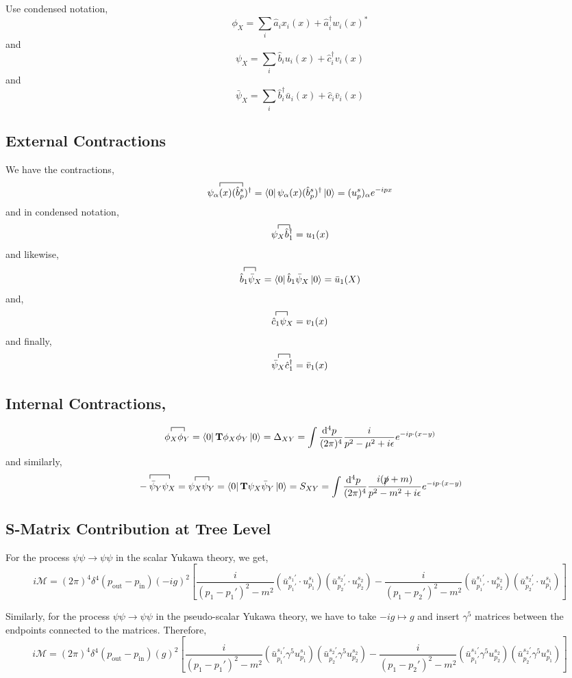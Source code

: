 \documentclass[12pt]{extarticle}
\newcommand{\bra}[1]{\left| #1 \right>}
\newcommand{\ket}[1]{\left| #1 \right>}
\renewcommand{\bra}[1]{\left< #1 \right|}
\newcommand{\dn}[2]{\! \mathrm{d}^{#1} #2 \:}
\renewcommand{\a}{\hat{a}}
\newcommand{\adag}{\hat{a}^\dagger}
\renewcommand{\b}{\hat{b}}
\newcommand{\bdag}{\hat{b}^\dagger}
\renewcommand{\c}{\hat{c}}
\newcommand{\cdag}{\hat{c}^\dagger}
\theoremstyle{definition}
\begin{document}
Use condensed notation,
\[ \phi_X = \sum_i \a_i x_i(x) + \adag_i w_i(x)^* \]
and 
\[ \psi_X = \sum_{i} \b_i u_i(x) + \cdag_i v_i(x) \]
and 
\[ \bar{\psi}_X = \sum_{i} \bdag_i \bar{u}_i (x) + \c_i \bar{v}_i (x) \]

\subsection{External Contractions}
We have the contractions,
$$
\contraction{}{\psi_{\alpha}(x)}{}{(\b_p^s)^\dagger}
\psi_{\alpha}(x) (\b_p^s)^\dagger = \bra{0} \psi_\alpha(x) (\b_p^s)^\dagger \ket{0} = (u_p^s)_\alpha e^{ - i p x}
$$
and in condensed notation,
$$
\contraction{}{\psi_X}{}{\bdag_1}
\psi_X \bdag_1 = u_1(x)
$$
and likewise,
$$
\contraction{}{\b_1}{}{\bar{\psi}_X}
\b_1 \bar{\psi}_X = \bra{0} \b_1 \bar{\psi}_X \ket{0} = \bar{u}_1(X)
$$
and,
$$
\contraction{}{\c_1}{}{\psi_X}
\c_1 \psi_X = v_1(x)
$$
and finally,
$$
\contraction{}{\bar{\psi}_X}{}{\cdag_1}
\bar{\psi}_X \cdag_1 = \bar{v}_1(x)
$$

\subsection{Internal Contractions,}
$$
\contraction{}{\phi_X}{}{\phi_Y}
\phi_X \phi_Y = \bra{0} \mathbf{T} \phi_X \phi_Y \ket{0} = \Delta_{X Y} = \int \frac{\dn{4}{p}}{(2 \pi)^4} \frac{i}{p^2 - \mu^2 + i \epsilon} e^{- i p \cdot (x - y)}
$$
and similarly,
$$
\contraction{}{-\bar{\psi}_Y}{}{\psi_X}
- \bar{\psi}_Y \psi_X = 
\contraction{}{\psi_X}{}{\bar{\psi}_Y}
\psi_X \psi_Y = \bra{0} \mathbf{T} \psi_X \bar{\psi}_Y \ket{0} = S_{X Y} = \int \frac{\dn{4}{p}}{(2 \pi)^4} \frac{i(\slashed{p} + m)}{p^2 - m^2 + i \epsilon} e^{- i p \cdot (x - y)}
$$

\subsection{S-Matrix Contribution at Tree Level}
For the process $\psi \psi \to \psi \psi$ in the scalar Yukawa theory, we get,
\[ i \mathcal{M} = (2\pi)^4 \delta^4(p_{\mathrm{out}} - p_{\mathrm{in}}) (-ig)^2 \left[ \frac{i}{(p_1 - p_1')^2 - m^2} (\bar{u}^{s_1'}_{p_1'} \cdot u_{p_1}^{s_1}) (\bar{u}_{p_2'}^{s_2'} \cdot u_{p_2}^{s_2}) -  \frac{i}{(p_1 - p_2')^2 - m^2} (\bar{u}^{s_1'}_{p_1'} \cdot u_{p_2}^{s_2}) (\bar{u}_{p_2'}^{s_2'} \cdot u_{p_1}^{s_1}) \right]
\]

Similarly, for the process $\psi \psi \to \psi \psi$ in the pseudo-scalar Yukawa theory,
we have to take $-ig \mapsto g$ and insert $\gamma^5$ matrices between the endpoints connected to the matrices. Therefore,
\[ i \mathcal{M} = (2\pi)^4 \delta^4(p_{\mathrm{out}} - p_{\mathrm{in}}) (g)^2 \left[ \frac{i}{(p_1 - p_1')^2 - m^2} (\bar{u}^{s_1'}_{p_1'} \gamma^5 u_{p_1}^{s_1}) (\bar{u}_{p_2'}^{s_2'} \gamma^5 u_{p_2}^{s_2}) -  \frac{i}{(p_1 - p_2')^2 - m^2} (\bar{u}^{s_1'}_{p_1'} \gamma^5 u_{p_2}^{s_2}) (\bar{u}_{p_2'}^{s_2'} \gamma^5 u_{p_1}^{s_1}) \right]
\]
\end{document}

